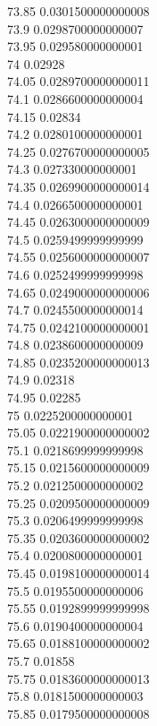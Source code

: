 {73.85	0.0301500000000008\\
73.9	0.0298700000000007\\
73.95	0.029580000000001\\
74	0.02928\\
74.05	0.0289700000000011\\
74.1	0.0286600000000004\\
74.15	0.02834\\
74.2	0.0280100000000001\\
74.25	0.0276700000000005\\
74.3	0.027330000000001\\
74.35	0.0269900000000014\\
74.4	0.0266500000000001\\
74.45	0.0263000000000009\\
74.5	0.0259499999999999\\
74.55	0.0256000000000007\\
74.6	0.0252499999999998\\
74.65	0.0249000000000006\\
74.7	0.0245500000000014\\
74.75	0.0242100000000001\\
74.8	0.0238600000000009\\
74.85	0.0235200000000013\\
74.9	0.02318\\
74.95	0.02285\\
75	0.0225200000000001\\
75.05	0.0221900000000002\\
75.1	0.0218699999999998\\
75.15	0.0215600000000009\\
75.2	0.0212500000000002\\
75.25	0.0209500000000009\\
75.3	0.0206499999999998\\
75.35	0.0203600000000002\\
75.4	0.0200800000000001\\
75.45	0.0198100000000014\\
75.5	0.0195500000000006\\
75.55	0.0192899999999998\\
75.6	0.0190400000000004\\
75.65	0.0188100000000002\\
75.7	0.01858\\
75.75	0.0183600000000013\\
75.8	0.0181500000000003\\
75.85	0.0179500000000008\\
}
